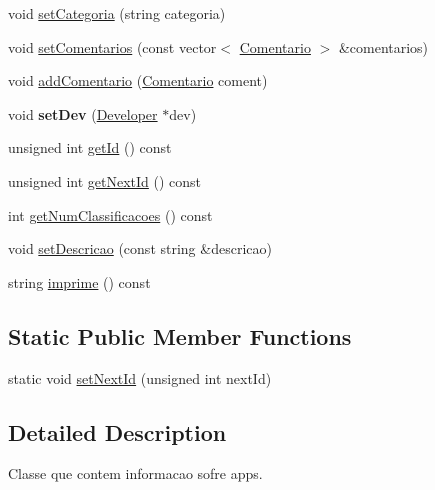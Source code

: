 \begin{DoxyCompactItemize}
\item 
void \hyperlink{class_app_add85e6926cb052edac84f210889df476}{set\+Categoria} (string categoria)
\item 
void \hyperlink{class_app_a40d8afcc9663054f4f5445a37dfd542d}{set\+Comentarios} (const vector$<$ \hyperlink{class_comentario}{Comentario} $>$ \&comentarios)
\item 
void \hyperlink{class_app_a4291a68b048c4976186ac2dc58062873}{add\+Comentario} (\hyperlink{class_comentario}{Comentario} coment)
\item 
\hypertarget{class_app_aa2d4de1233b4a07def3cdae0d165d4cf}{void {\bfseries set\+Dev} (\hyperlink{class_developer}{Developer} $\ast$dev)}\label{class_app_aa2d4de1233b4a07def3cdae0d165d4cf}

\item 
unsigned int \hyperlink{class_app_a17d1e4e52f2357b25437d21d21728bcb}{get\+Id} () const 
\item 
unsigned int \hyperlink{class_app_ae8bc0359346587f5e98885e4bdba3db0}{get\+Next\+Id} () const 
\item 
int \hyperlink{class_app_afca72f5119a5fbb1c7972d8085abc2c7}{get\+Num\+Classificacoes} () const 
\item 
void \hyperlink{class_app_af0140ea32801ddf481e61fda65024ba8}{set\+Descricao} (const string \&descricao)
\item 
string \hyperlink{class_app_af3a98845da9ba10769df22e1e21f3db0}{imprime} () const 
\end{DoxyCompactItemize}
\subsection*{Static Public Member Functions}
\begin{DoxyCompactItemize}
\item 
static void \hyperlink{class_app_ac02dab3cd7642d98173bfd6365eb6d9e}{set\+Next\+Id} (unsigned int next\+Id)
\end{DoxyCompactItemize}


\subsection{Detailed Description}
Classe que contem informacao sofre apps. 

